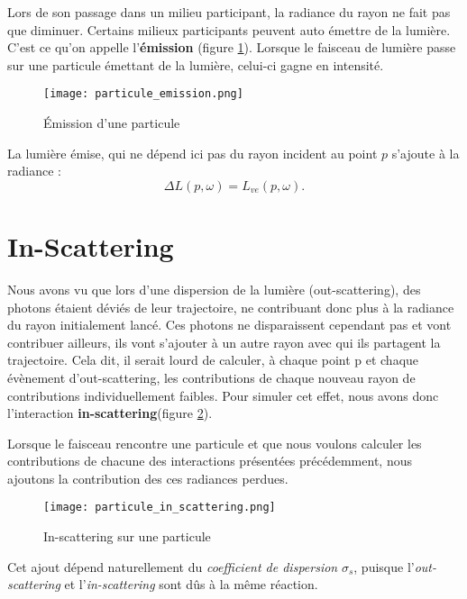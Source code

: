 Lors de son passage dans un milieu participant, la radiance du rayon ne fait pas que diminuer. Certains milieux participants peuvent auto émettre de la lumière. C'est ce qu'on appelle l'\textbf{émission} (figure \ref{fig:emission}). Lorsque le faisceau de lumière passe sur une particule émettant de la lumière, celui-ci gagne en intensité.

\begin{figure}[h!]\label{fig:emission}
\centering
\texttt{[image: particule\_emission.png]}
\caption{Émission d'une particule}
\end{figure}

La lumière émise, qui ne dépend ici pas du rayon incident au point $p$ s'ajoute à la radiance :
\large \begin{equation}
    \Delta L(p, \omega) = L_{ve}(p, \omega)
.\end{equation} \normalsize

\section{In-Scattering}

Nous avons vu que lors d'une dispersion de la lumière (out-scattering), des photons étaient déviés de leur trajectoire, ne contribuant donc plus à la radiance du rayon initialement lancé. Ces photons ne disparaissent cependant pas et vont contribuer ailleurs, ils vont s'ajouter à un autre rayon avec qui ils partagent la trajectoire. Cela dit, il serait lourd de calculer, à chaque point p et chaque évènement d'out-scattering, les contributions de chaque nouveau rayon de contributions individuellement faibles. Pour simuler cet effet, nous avons donc l'interaction \textbf{in-scattering}(figure \ref{fig:in_scattering}).\par
Lorsque le faisceau rencontre une particule et que nous voulons calculer les contributions de chacune des interactions présentées précédemment, nous ajoutons la contribution des ces radiances perdues.

\begin{figure}[h!]\label{fig:in_scattering}
\centering
\texttt{[image: particule\_in\_scattering.png]}
\caption{In-scattering sur une particule}
\end{figure}

Cet ajout dépend naturellement du \textit{coefficient de dispersion} $\sigma_{s}$, puisque l'\textit{out-scattering} et l'\textit{in-scattering} sont dûs à la même réaction.\par


